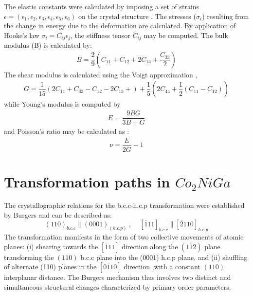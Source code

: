 \documentclass[%
preprint,
 amsmath,amssymb,
 aps,
prb,
showkeys,
]{revtex4-1}
\begin{document}
	The elastic constants were calculated by imposing a set of strains $\epsilon=( \epsilon_{1}, \epsilon_{2}, \epsilon_{3}, \epsilon_{4}, \epsilon_{5}, \epsilon_{6})$ 
	on the crystal structure \cite{ganeshan2009effect,ganeshan2009elastic,shang2010first,le2002symmetry,duong2011ab}. The stresses ($\sigma_{i}$) resulting from the change in energy due to the deformation are calculated. By application of  Hooke's law $\sigma_{i}=C_{ij}\epsilon_{j} $, the stiffness tensor $C_{ij}$ may be computed.
	The bulk modulus (B) is calculated by\cite{duong2011ab}:
		\begin{align}
		B = \dfrac{2}{9}\left({C_{11}+C_{12}+ 2C_{13}+ \dfrac{C_{33}}{2}}\right) 
		\end{align}
	The shear modulus is calculated using the Voigt approximation \cite{duong2011ab},
		\begin{align}
		G = \dfrac{1}{15}\left(2C_{11} + C_{33} -C_{12} -2C_{13}+ \right) +
		\dfrac{1}{5} \left( 2C_{44} + \dfrac{1}{2} (C_{11}-C_{12})\right) 
		\end{align}
	while Young's modulus is computed by \cite{duong2011ab}
		\begin{align}
		E = \dfrac{9BG}{3B+G}
		\end{align}
	and Poisson's ratio may be calculated as :
		\begin{align}
		\nu = \dfrac{E}{2G}-1
		\end{align}
\section{Transformation paths in \texorpdfstring{$Co_2NiGa$}{CO2NiGa} }
\label{Sec:transformations}

The crystallographic relations for the b.c.c-h.c.p transformation were established  by Burgers \cite{burger1934} and can be described as:
\begin{equation}
(110)_{b.c.c} \parallel (0 0 0 1)_{(h.c.p)} \ , \ \ \ \ \;[\bar{1}  1  1]_{b.c.c} \parallel [\bar{2}  1  1  0]_{h.c.p}
\end{equation}
The transformation manifests in the form of two collective movements of atomic planes:
 (i) shearing towards the $[\bar{1} 1 1]$ direction along the $(1\bar{1}2)$  plane transforming the $(110)$ b.c.c plane into the (0001) h.c.p plane, and (ii) shuffling of alternate (110) planes
in the $[0\bar{1} 1 0]$ direction ,with a  constant $(110)$ interplanar distance.
The Burgers mechanism thus involves two distinct and simultaneous structural changes characterized by primary order parameters.
\end{document}

